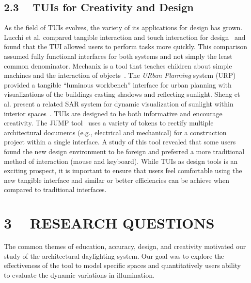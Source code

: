 \documentclass{article}
\begin{document}
\subsection{2.3 ~ TUIs for Creativity and Design}

As the field of TUIs evolves, the variety of its applications for
design has grown.  Lucchi et al. compared tangible interaction and
touch interaction for design~\cite{1709917} and found that the TUI
allowed users to perform tasks more quickly.  This comparison assumed
fully functional interfaces for both systems and not simply the least
common denominator.  
%
Mechanix is a tool that
teaches children about simple machines and the interaction of
objects~\cite{TsengBB11}.  
%
The {\em URban Planning} system
(URP)~\cite{Underkoffler:1999:ULW:302979.303114} provided a tangible
``luminous workbench'' interface for urban planning with
visualizations of the buildings casting shadows and reflecting
sunlight.
%
Sheng et al. present a related SAR system for dynamic
visualization of sunlight within interior spaces~\cite{sheng_TVCG}.
%
TUIs are designed to be both informative and encourage creativity.
The JUMP tool~\cite{1268540} uses a variety of tokens to rectify
multiple architectural documents (e.g., electrical and mechanical) for
a construction project within a single interface.  A study of this
tool revealed that some users found the new design environment to be
foreign and preferred a more traditional method of interaction (mouse
and keyboard).  
%
While TUIs as design tools is an exciting prospect, it is important to
ensure that users feel comfortable using the new tangible interface
and similar or better efficiencies can be achieve when compared to
traditional interfaces.






\section{3 ~ RESEARCH QUESTIONS}

The common themes of education, accuracy, design, and creativity
motivated our study of the architectural daylighting system.  Our goal
was to explore the effectiveness of the tool to model specific spaces
and quantitatively users ability to evaluate the dynamic variations in
illumination.  

%
\end{document}

